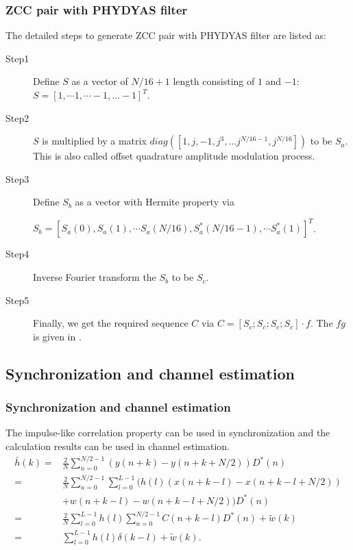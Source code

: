 \documentclass[8 pt]{beamer} %
\begin{document}
\begin{frame}
\frametitle{ZCC pair with PHYDYAS filter}
The detailed steps to generate ZCC pair with PHYDYAS filter are listed as:
\begin{description}
\item[Step1] Define $S$ as a vector of $N/16+1$ length consisting of $1$ and $-1$:
        $S=[1, \cdots 1, \cdots -1, \ldots -1]^T$.
\item[Step2] $S$ is multiplied by a matrix $diag([1,j,-1,j^3,\ldots j^{N/16-1},j^{N/16}])$ to be $S_{a}$. This is also called offset quadrature amplitude modulation process.
\item[Step3] Define $S_b$ as a vector with Hermite property via

        $S_b=[S_{a}(0),S_{a}(1),\cdots S_{a}(N/16),S_{a}^*(N/16-1),\cdots S_{a}^*(1)]^T$.
\item[Step4] Inverse Fourier transform the $S_b$ to be $S_c$.
\item[Step5] Finally, we get the required sequence $C$ via $C=[ S_c; S_c; S_c; S_c]\cdot f$. The $fg$ is given in \cite{Bellanger2010}.
\end{description}

\end{frame}

\subsection{Synchronization and channel estimation}
\begin{frame}
\frametitle{Synchronization and channel estimation}
The impulse-like correlation property can be used in synchronization and the calculation results can be used in channel estimation.
\begin{align}\label{equ:gain_acquire}
          \bar{h}(k)=&\frac{2}{N}\sum_{n=0}^{N/2-1}(y(n+k)-y(n+k+N/2))D^*(n)\nonumber\\
          =&\frac{2}{N}\sum_{n=0}^{N/2-1}\sum_{l=0}^{L-1}(h(l)(x(n+k-l)-x(n+k-l+N/2))\nonumber\\
          &+w(n+k-l)-w(n+k-l+N/2))D^*(n)\nonumber\\
          =&\frac{2}{N}\sum_{l=0}^{L-1}h(l)\sum_{n=0}^{N/2-1}C(n+k-l)D^*(n)+\tilde{w}(k)\nonumber\\
          =&\sum_{l=0}^{L-1}h(l)\delta(k-l)+\tilde{w}(k).
\end{align}
\end{frame}
\end{document}
